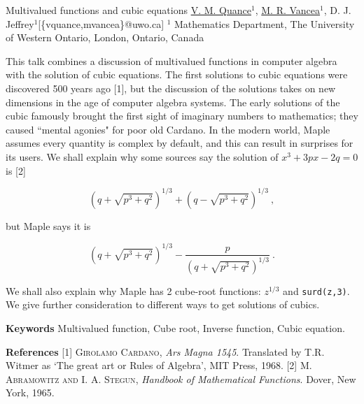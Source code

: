


\begin{abstract_online}{Multivalued functions and cubic equations}{%
        \underline{V. M. Quance}$^{1}$, \underline{M. R. Vancea}$^{1}$, D. J. Jeffrey$^{1}$}{[\{vquance,mvancea\}@uwo.ca]
        }{%
        $^1$ Mathematics Department, The University of Western Ontario, London, Ontario, Canada}

This talk combines a discussion of multivalued functions in computer algebra with the solution of cubic equations. 
The first solutions to cubic equations were discovered 500 years ago [1], but the discussion of the solutions takes on new dimensions in the age of computer algebra systems. The early solutions of the cubic famously brought the first sight of imaginary numbers to mathematics; they caused ``mental agonies" for poor old Cardano. In the modern world, Maple assumes every quantity is complex by default, and this can result in surprises for its users. We shall explain why some sources say the solution of $x^3+3px-2q=0$ is [2]

\[ \left(q+\sqrt{p^3+q^2}\right)^{1/3} + \left(q-\sqrt{p^3+q^2}\right)^{1/3}\ , \]

but Maple says it is

\[\left(q+\sqrt{p^3+q^2}\right)^{1/3} - \frac{p}{\left(q+\sqrt{p^3+q^2}\right)^{1/3}}\ .\]

We shall also explain why Maple has 2 cube-root functions: $z^{1/3}$ and \texttt{surd(z,3)}. We give further consideration to different ways to get solutions of cubics.

\textbf{Keywords} \newline{} Multivalued function, Cube root, Inverse function, Cubic equation.

\textbf{References} \newline{}
[1] \textsc{Girolamo Cardano}, \emph{Ars Magna 1545}. Translated by T.R. Witmer as `The great art or
Rules of Algebra', {MIT Press}, 1968. \newline{}
[2] \textsc{M. Abramowitz and I. A. Stegun}, \emph{Handbook of Mathematical Functions}. Dover, New York, 1965. \newline{}
\end{abstract_online}
